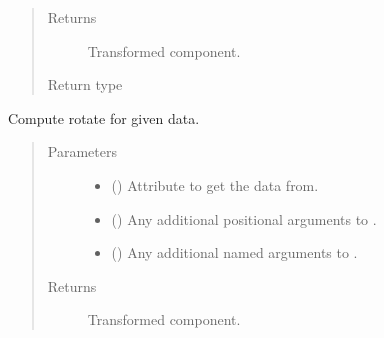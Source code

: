 \documentclass[letterpaper,10pt,english]{sphinxmanual}
\begin{document}
\begin{fulllineitems}
\begin{fulllineitems}
\begin{quote}
\begin{description}
\begin{itemize}
\end{itemize}

\item[{Returns}] \leavevmode
{} \textendash{} Transformed component.

\item[{Return type}] \leavevmode
{\hyperref[\detokenize{api/base_classes:geology.src.base_spatial.SpatialComponent}]{}}

\end{description}\end{quote}

\end{fulllineitems}


\begin{fulllineitems}
\label{\detokenize{api/rock:geology.src.Rock.rotate}}
Compute rotate for given data.
\begin{quote}\begin{description}
\item[{Parameters}] \leavevmode\begin{itemize}
\item {} 
 (\sphinxstyleliteralemphasis{\sphinxupquote{, }}) \textendash{} Attribute to get the data from.

\item {} 
 () \textendash{} Any additional positional arguments to .

\item {} 
 () \textendash{} Any additional named arguments to .

\end{itemize}

\item[{Returns}] \leavevmode
{} \textendash{} Transformed component.


\end{description}
\end{quote}
\end{fulllineitems}
\end{fulllineitems}
\end{document}
